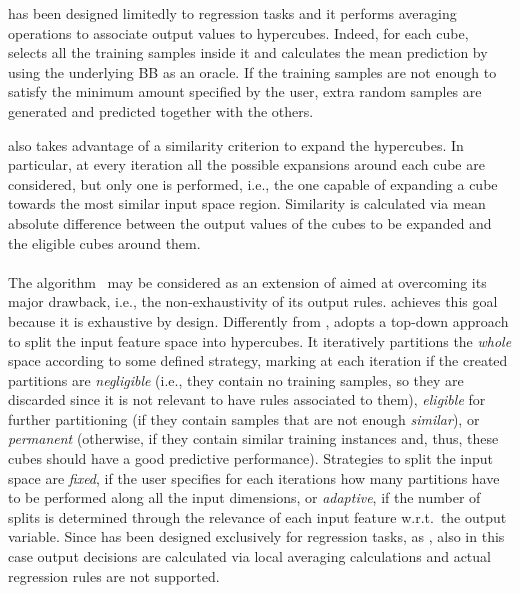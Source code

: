 \documentclass[
]{ceurart}
\begin{document}
\iter{} has been designed limitedly to regression tasks and it performs averaging operations to associate output values to hypercubes.
%
Indeed, for each cube, \iter{} selects all the training samples inside it and calculates the mean prediction by using the underlying BB as an oracle.
%
If the training samples are not enough to satisfy the minimum amount specified by the user, extra random samples are generated and predicted together with the others.

\iter{} also takes advantage of a similarity criterion to expand the hypercubes.
%
In particular, at every iteration all the possible expansions around each cube are considered, but only one is performed, i.e., the one capable of expanding a cube towards the most similar input space region.
%
Similarity is calculated via mean absolute difference between the output values of the cubes to be expanded and the eligible cubes around them.

\paragraph{\gridex{}}

The \gridex{} algorithm~\cite{gridex-extraamas2021} may be considered as an extension of \iter{} aimed at overcoming its major drawback, i.e., the non-exhaustivity of its output rules.
%
\gridex{} achieves this goal because it is exhaustive by design.
%
Differently from \iter{}, \gridex{} adopts a top-down approach to split the input feature space into hypercubes.
%
It iteratively partitions the \emph{whole} space according to some defined strategy, marking at each iteration if the created partitions are \emph{negligible} (i.e., they contain no training samples, so they are discarded since it is not relevant to have rules associated to them), \emph{eligible} for further partitioning (if they contain samples that are not enough \emph{similar}), or \emph{permanent} (otherwise, if they contain similar training instances and, thus, these cubes should have a good predictive performance).
%
Strategies to split the input space are \emph{fixed}, if the user specifies for each iterations how many partitions have to be performed along all the input dimensions, or \emph{adaptive}, if the number of splits is determined through the relevance of each input feature w.r.t.\ the output variable.
%
Since \gridex{} has been designed exclusively for regression tasks, as \iter{}, also in this case output decisions are calculated via local averaging calculations and actual regression rules are not supported.
\end{document}
